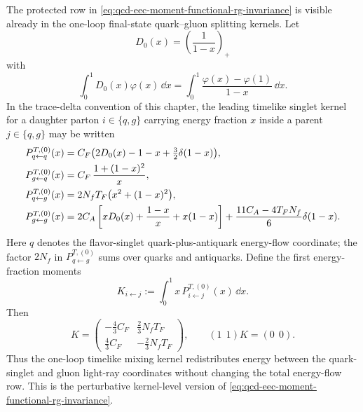 \begin{proposition}
\label{prop:qcd-eec-timelike-momentum-sum-rule}
The protected row in
\eqref{eq:qcd-eec-moment-functional-rg-invariance} is visible already in the
one-loop final-state quark--gluon splitting kernels.  Let
\[
  D_0(x)=\left(\frac1{1-x}\right)_+
\]
with
\[
  \int_0^1D_0(x)\varphi(x)\,\dd x
  =
  \int_0^1\frac{\varphi(x)-\varphi(1)}{1-x}\,\dd x .
\]
In the trace-delta convention of this chapter, the leading timelike singlet
kernel for a daughter parton \(i\in\{q,g\}\) carrying energy fraction \(x\)
inside a parent \(j\in\{q,g\}\) may be written
\begin{align}
  P^{T,(0)}_{q\leftarrow q}(x)
  &=
  C_F\bigl(2D_0(x)-1-x+\tfrac32\delta(1-x)\bigr),
  \notag\\
  P^{T,(0)}_{g\leftarrow q}(x)
  &=
  C_F\,\frac{1+(1-x)^2}{x},
  \notag\\
  P^{T,(0)}_{q\leftarrow g}(x)
  &=
  2N_fT_F\bigl(x^2+(1-x)^2\bigr),
  \notag\\
  P^{T,(0)}_{g\leftarrow g}(x)
  &=
  2C_A\left[
    xD_0(x)+\frac{1-x}{x}+x(1-x)
  \right]
  +
  \frac{11C_A-4T_FN_f}{6}\delta(1-x).
  \label{eq:qcd-eec-timelike-one-loop-kernels}
\end{align}
Here \(q\) denotes the flavor-singlet quark-plus-antiquark energy-flow
coordinate; the factor \(2N_f\) in \(P^{T,(0)}_{q\leftarrow g}\) sums over
quarks and antiquarks.  Define the first energy-fraction moments
\[
  K_{i\leftarrow j}:=\int_0^1x\,P^{T,(0)}_{i\leftarrow j}(x)\,\dd x .
\]
Then
\begin{equation}
  K
  =
  \begin{pmatrix}
  -\frac43C_F & \frac23N_fT_F\\[4pt]
   \frac43C_F & -\frac23N_fT_F
  \end{pmatrix},
  \qquad
  (1\ \ 1)K=(0\ \ 0).
  \label{eq:qcd-eec-timelike-momentum-matrix}
\end{equation}
Thus the one-loop timelike mixing kernel redistributes energy between the
quark-singlet and gluon light-ray coordinates without changing the total
energy-flow row.  This is the perturbative kernel-level version of
\eqref{eq:qcd-eec-moment-functional-rg-invariance}.
\end{proposition}

